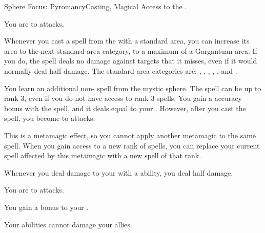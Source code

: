   \begin{magicalfeat}{Sphere Focus: Pyromancy}{Casting, Magical}
    \featpre Access to the  .

     You are \resistant to \atFire attacks.

     Whenever you cast a spell from the   with a standard area, you can increase its area to the next standard area category, to a maximum of a Gargantuan area.
    If you do, the spell deals no damage against targets that it misses, even if it would normally deal half damage.
    The standard area categories are: \tinyarea, \smallarea, \medarea, \largearea, \hugearea, and \gargarea.

     You learn an additional non- spell from the  mystic sphere.
    The spell can be up to rank 3, even if you do not have access to rank 3 spells.
    You gain a  accuracy bonus with the spell, and it deals  equal to your .
    However, after you cast the spell, you become \briefly \vulnerable to \atCold attacks.

    This is a metamagic effect, so you cannot apply another metamagic to the same spell.
    When you gain access to a new rank of spells, you can replace your current spell affected by this metamagic with a new spell of that rank.

     Whenever you deal damage to your  with a \atFire ability, you deal half damage.

     You are  to \atFire attacks.

     You gain a  bonus to your .

     Your \atFire abilities cannot damage your allies.
  \end{magicalfeat}

